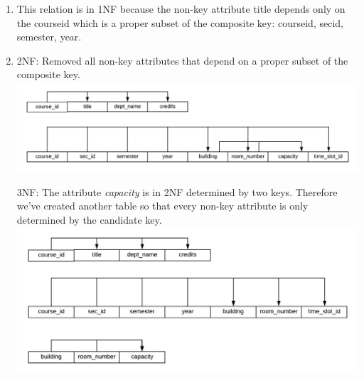 \documentclass[12pt,letterpaper]{article}
\begin{document}
\begin{enumerate}[label={4.\arabic*},nolistsep,leftmargin=*]
  \item
   This relation is in 1NF because the non-key attribute title depends only on the course\textunderscore id which is a proper subset of the composite key: course\textunderscore id, sec\textunderscore id, semester, year.
  \item
    2NF: Removed all non-key attributes that depend on a proper subset of the composite key.  \\
    \includegraphics[width=1.0\textwidth, center]{images/2NF.png}
    
    \newpage
    3NF: The attribute \textit{capacity} is in 2NF determined by two keys. Therefore we've created another table so that every non-key attribute is only determined by the candidate key.  \\
    \includegraphics[width=1.0\textwidth, center]{images/3NF.png}

    
\end{enumerate}
\end{document}

